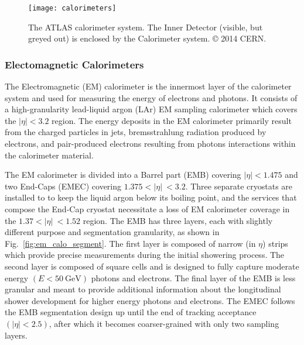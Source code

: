 \begin{figure}
	\centering
	\texttt{[image: calorimeters]}
	\caption{The ATLAS calorimeter system. The Inner Detector (visible, but greyed out) is enclosed by the Calorimeter system. © 2014 CERN.}
	\label{fig:calorimeter}
\end{figure}

\subsubsection{Electomagnetic Calorimeters}
The Electromagnetic (EM) calorimeter is the innermost layer of the calorimeter system and used for measuring the energy of electrons and photons.
It consists of a high-granularity lead-liquid argon (LAr) EM sampling calorimeter which covers the $|\eta| < 3.2$ region.
The energy deposits in the EM calorimeter primarily result from the charged particles in jets, bremsstrahlung radiation produced by electrons, and pair-produced electrons resulting from photons interactions within the calorimeter material.

The EM calorimeter is divided into a Barrel part (EMB) covering $|\eta| < 1.475$ and two End-Caps (EMEC) covering $1.375 < |\eta|\ < 3.2$.
Three separate cryostats are installed to to keep the liquid argon below its boiling point, and the services that compose the End-Cap cryostat necessitate a loss of EM calorimeter coverage in the $1.37 < |\eta|\ < 1.52$ region.
The EMB has three layers, each with slightly different purpose and segmentation granularity, as shown in Fig.~\ref{fig:em_calo_segment}.
The first layer is composed of narrow (in $\eta$) strips which provide precise measurements during the initial showering process.
The second layer is composed of square cells and is designed to fully capture moderate energy $(E < 50 \ \mathrm{GeV})$ photons and electrons.
The final layer of the EMB is less granular and meant to provide additional information about the longitudinal shower development for higher energy photons and electrons.
The EMEC follows the EMB segmentation design up until the end of tracking acceptance $(|\eta| < 2.5)$, after which it becomes coarser-grained with only two sampling layers.

